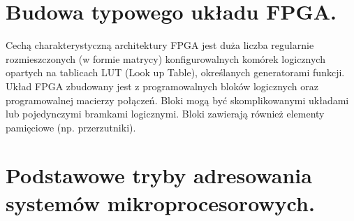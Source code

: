 \documentclass[12pt,a4paper]{article}
\begin{document}
	\section{Budowa typowego układu FPGA.}
	Cechą charakterystyczną architektury FPGA jest duża liczba regularnie rozmieszczonych (w formie matrycy) konfigurowalnych komórek logicznych opartych na tablicach LUT (Look up Table), określanych generatorami funkcji. Układ FPGA zbudowany jest z programowalnych bloków logicznych oraz programowalnej macierzy połączeń. Bloki mogą być skomplikowanymi układami lub pojedynczymi bramkami logicznymi. Bloki zawierają również elementy pamięciowe (np. przerzutniki).

	\section{Podstawowe tryby adresowania systemów mikroprocesorowych.}
\end{document}

